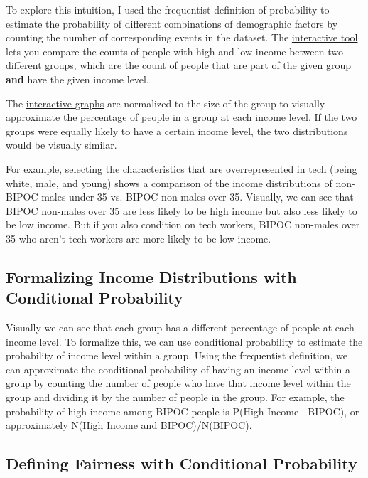\documentclass[12pt]{article}
\begin{document}
To explore this intuition, I used the frequentist definition of probability\cite{piech:prob} to estimate the probability of different combinations of demographic factors by counting the number of corresponding events in the dataset. The \href{https://observablehq.com/d/b1dfcf5fca53a8b2#cell-1196}{interactive tool} lets you compare the counts of people with high and low income between two different groups, which are the count of people that are part of the given group \textbf{and} have the given income level.\cite{piech:and}

The \href{https://observablehq.com/d/b1dfcf5fca53a8b2#cell-1196}{interactive graphs} are normalized to the size of the group to visually approximate the percentage of people in a group at each income level. If the two groups were equally likely to have a certain income level, the two distributions would be visually similar.

For example, selecting the characteristics that are overrepresented in tech (being white, male, and young) shows a comparison of the income distributions of non-BIPOC males under 35 vs. BIPOC non-males over 35.  Visually, we can see that BIPOC non-males over 35 are less likely to be high income but also less likely to be low income. But if you also condition on tech workers, BIPOC non-males over 35 who aren't tech workers are more likely to be low income.

\subsection*{Formalizing Income Distributions with Conditional Probability}

Visually we can see that each group has a different percentage of people at each income level. To formalize this, we can use conditional probability\cite{piech:cond} to estimate the probability of income level within a group. Using the frequentist definition, we can approximate the conditional probability of having an income level within a group by counting the number of people who have that income level within the group and dividing it by the number of people in the group. For example, the probability of high income among BIPOC people is P(High Income | BIPOC), or approximately N(High Income and BIPOC)/N(BIPOC).

\subsection*{Defining Fairness with Conditional Probability}
\end{document}
